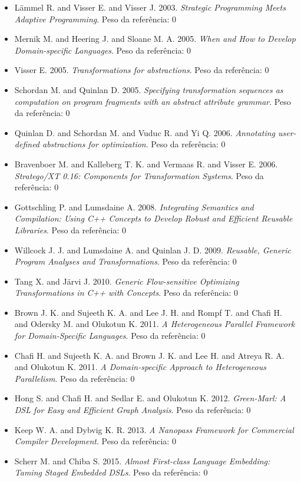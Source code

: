 \begin{itemize}
\item L\"{a}mmel R. and Visser E. and Visser J.
      2003.
      {\it Strategic Programming Meets Adaptive Programming}.
      Peso da referência: 0
\item Mernik M. and Heering J. and Sloane M. A.
      2005.
      {\it When and How to Develop Domain-specific Languages}.
      Peso da referência: 0
\item Visser E.
      2005.
      {\it Transformations for abstractions}.
      Peso da referência: 0
\item Schordan M. and Quinlan D.
      2005.
      {\it Specifying transformation sequences as computation on program fragments with an abstract attribute grammar}.
      Peso da referência: 0
\item Quinlan D. and Schordan M. and Vuduc R. and Yi Q.
      2006.
      {\it Annotating user-defined abstractions for optimization}.
      Peso da referência: 0
\item Bravenboer M. and Kalleberg T. K. and Vermaas R. and Visser E.
      2006.
      {\it Stratego/XT 0.16: Components for Transformation Systems}.
      Peso da referência: 0
\item Gottschling P. and Lumsdaine A.
      2008.
      {\it Integrating Semantics and Compilation: Using C++ Concepts to Develop Robust and Efficient Reusable Libraries}.
      Peso da referência: 0
\item Willcock J. J. and Lumsdaine A. and Quinlan J. D.
      2009.
      {\it Reusable, Generic Program Analyses and Transformations}.
      Peso da referência: 0
\item Tang X. and J\"{a}rvi J.
      2010.
      {\it Generic Flow-sensitive Optimizing Transformations in C++ with Concepts}.
      Peso da referência: 0
\item Brown J. K. and Sujeeth K. A. and Lee J. H. and Rompf T. and Chafi H. and Odersky M. and Olukotun K.
      2011.
      {\it A Heterogeneous Parallel Framework for Domain-Specific Languages}.
      Peso da referência: 0
\item Chafi H. and Sujeeth K. A. and Brown J. K. and Lee H. and Atreya R. A. and Olukotun K.
      2011.
      {\it A Domain-specific Approach to Heterogeneous Parallelism}.
      Peso da referência: 0
\item Hong S. and Chafi H. and Sedlar E. and Olukotun K.
      2012.
      {\it Green-Marl: A DSL for Easy and Efficient Graph Analysis}.
      Peso da referência: 0
\item Keep W. A. and Dybvig K. R.
      2013.
      {\it A Nanopass Framework for Commercial Compiler Development}.
      Peso da referência: 0
\item Scherr M. and Chiba S.
      2015.
      {\it Almost First-class Language Embedding: Taming Staged Embedded DSLs}.
      Peso da referência: 0
\end{itemize}

